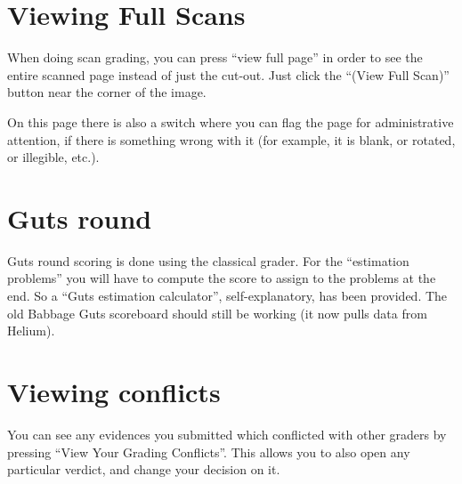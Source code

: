 \section{Viewing Full Scans}
\label{sec:view_full}
When doing scan grading, you can press ``view full page''
in order to see the entire scanned page instead of just the cut-out.
Just click the ``(View Full Scan)'' button near the corner of the image.

On this page there is also a switch where you can flag the page
for administrative attention, if there is something wrong with it
(for example, it is blank, or rotated, or illegible, etc.).

\section{Guts round}
\begin{itemize}
	\ii Guts round scoring is done using the classical grader.
	\ii For the ``estimation problems'' you will have to compute the score
	to assign to the problems at the end.
	So a ``Guts estimation calculator'', self-explanatory,
	has been provided.
	\ii The old Babbage Guts scoreboard should still be working
	(it now pulls data from Helium).
\end{itemize}

\section{Viewing conflicts}
You can see any evidences you submitted which conflicted with other graders
by pressing ``View Your Grading Conflicts''.
This allows you to also open any particular verdict,
and change your decision on it.


